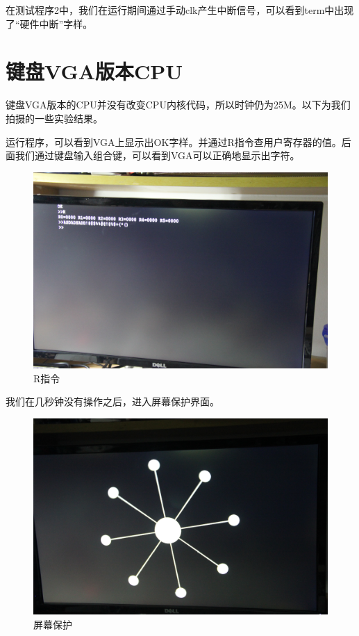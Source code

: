 在测试程序2中，我们在运行期间通过手动clk产生中断信号，可以看到term中出现了“硬件中断”字样。


\section{键盘VGA版本CPU}

键盘VGA版本的CPU并没有改变CPU内核代码，所以时钟仍为25M。以下为我们拍摄的一些实验结果。

运行程序，可以看到VGA上显示出OK字样。并通过R指令查用户寄存器的值。后面我们通过键盘输入组合键，可以看到VGA可以正确地显示出字符。

\begin{figure}[H]
  \centering
  \includegraphics[width=4.5in]{Figures/picture/IMG_7232.JPG}
  \caption{R指令}
\end{figure}

我们在几秒钟没有操作之后，进入屏幕保护界面。

\begin{figure}[H]
  \centering
  \includegraphics[width=4.5in]{Figures/picture/IMG_7233.JPG}
  \caption{屏幕保护}
\end{figure}

